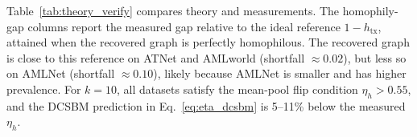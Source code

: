 \documentclass[sigconf,natbib=true,anonymous=true]{acmart}
\theoremstyle{definition}
\newcommand{\hofinet}{ATNet\xspace} %
\begin{document}
Table~\ref{tab:theory_verify} compares theory and measurements. The homophily-gap columns report the measured gap relative to the ideal reference $1-h_{\text{tx}}$, attained when the recovered graph is perfectly homophilous. The recovered graph is close to this reference on \hofinet and AMLworld (shortfall $\approx 0.02$), but less so on AMLNet (shortfall $\approx 0.10$), likely because AMLNet is smaller and has higher prevalence. For $k=10$, all datasets satisfy the mean-pool flip condition $\eta_h > 0.55$, and the DCSBM prediction in Eq.~\eqref{eq:eta_dcsbm} is 5--11\% below the measured $\eta_h$.



\end{document}
